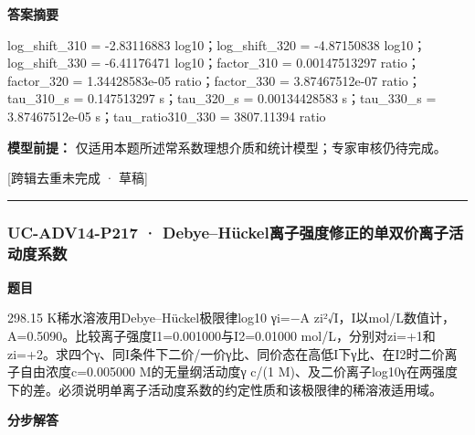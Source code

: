 \documentclass[UTF8,11pt,a4paper]{ctexart}
\begin{document}
\noindent\textbf{答案摘要}\par
log\_shift\_310 = -2.83116883 log10；log\_shift\_320 = -4.87150838 log10；log\_shift\_330 = -6.41176471 log10；factor\_310 = 0.00147513297 ratio；factor\_320 = 1.34428583e-05 ratio；factor\_330 = 3.87467512e-07 ratio；tau\_310\_s = 0.147513297 s；tau\_320\_s = 0.00134428583 s；tau\_330\_s = 3.87467512e-05 s；tau\_ratio310\_330 = 3807.11394 ratio\par
\noindent\textbf{模型前提：}
仅适用本题所述常系数理想介质和统计模型；专家审核仍待完成。\par
\noindent\textcolor{red!65!black}{[跨辑去重未完成 · 草稿]} \par
\medskip\hrule\medskip
{}
\subsubsection*{UC-ADV14-P217 · Debye–Hückel离子强度修正的单双价离子活动度系数}
\noindent\textbf{题目}\par
298.15 K稀水溶液用Debye–Hückel极限律log10 γi=−A zi²√I，I以mol/L数值计，A=0.5090。比较离子强度I1=0.001000与I2=0.01000 mol/L，分别对zi=+1和zi=+2。求四个γ、同I条件下二价/一价γ比、同价态在高低I下γ比、在I2时二价离子自由浓度c=0.005000 M的无量纲活动度γ c/(1 M)、及二价离子log10γ在两强度下的差。必须说明单离子活动度系数的约定性质和该极限律的稀溶液适用域。\par
\medskip\noindent\textbf{分步解答}
\end{document}
